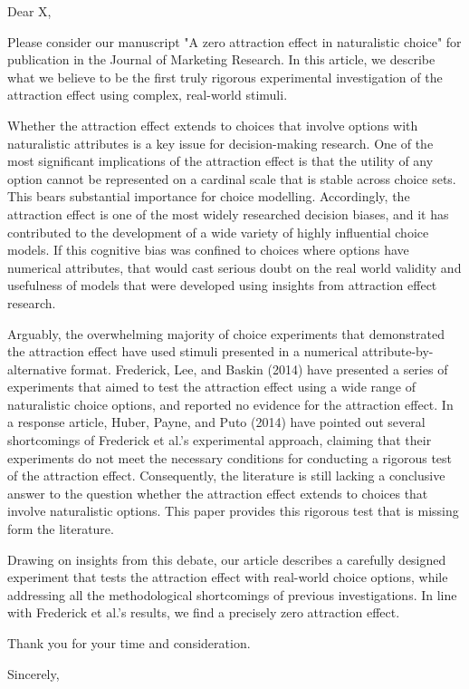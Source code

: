 \documentclass{letter}
\begin{document}
\begin{letter}
{}
\opening{Dear X,}


Please consider our manuscript "A zero attraction effect in naturalistic choice" for publication in the Journal of Marketing Research. In this article, we describe what we believe to be the first truly rigorous experimental investigation of the attraction effect using complex, real-world stimuli.

Whether the attraction effect extends to choices that involve options with naturalistic attributes is a key issue for decision-making research. One of the most significant implications of the attraction effect is that the utility of any option cannot be represented on a cardinal scale that is stable across choice sets. This bears substantial importance for choice modelling. Accordingly, the attraction effect is one of the most widely researched decision biases, and it has contributed to the development of a wide variety of highly influential choice models. If this cognitive bias was confined to choices where options have numerical attributes, that would cast serious doubt on the real world validity and usefulness of models that were developed using insights from attraction effect research.

Arguably, the overwhelming majority of choice experiments that demonstrated the attraction effect have used stimuli presented in a numerical attribute-by-alternative format. Frederick, Lee, and Baskin (2014) have presented a series of experiments that aimed to test the attraction effect using a wide range of naturalistic choice options, and reported no evidence for the attraction effect. In a response article, Huber, Payne, and Puto (2014) have pointed out several shortcomings of Frederick et al.'s experimental approach, claiming that their experiments do not meet the necessary conditions for conducting a rigorous test of the attraction effect. Consequently, the literature is still lacking a conclusive answer to the question whether the attraction effect extends to choices that involve naturalistic options. This paper provides this rigorous test that is missing form the literature.

Drawing on insights from this debate, our article describes a carefully designed experiment that tests the attraction effect with real-world choice options, while addressing all the methodological shortcomings of previous investigations. In line with Frederick et al.'s results, we find a precisely zero attraction effect.


Thank you for your time and consideration.


\closing{Sincerely,}



\end{letter}
\end{document}
